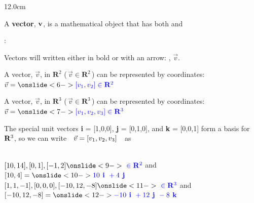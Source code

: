 \begin{frame}
\frametitle{}
\scriptsize
\begin{columns}
\begin{column}{12.0cm}
	
	\DEF A {\bf vector}, ${\bf v}$, is a mathematical object that has both  and \ON<3->{\B{\quad direction.}}

\vspace{0.3cm}

: \\

\vspace{0.2cm}

\OBUL  Vectors will written either in bold or with an arrow: , $\vec{v}$.\\

\vspace{0.2cm}

\OBUL  A vector, $\vec{v}$, in $\mathbf{R}^2$ (\,$\vec{v} \in \mathbf{R}^2$\,) can be represented by  coordinates: \quad $\vec{v} = \ON<6->{\B{\VV \in \mathbf{R}^2}}$\\

\vspace{0.2cm}

\OBUL  A vector, $\vec{v}$, in $\mathbf{R}^3$ (\,$\vec{v} \in \mathbf{R}^3$\,) can be represented by  coordinates: \quad $\vec{v} = \ON<7->{\B{\VVV \in \mathbf{R}^3}}$\\

\vspace{0.2cm}

\OBUL  The special unit vectors {\bf i} = [1,0,0], {\bf j} = [0,1,0], and {\bf k} = [0,0,1] form a basis for $\mathbf{R}^3$, \NEWLINE so we can write \,\, $\vec{v} = [v_1,v_2,v_3]$ \,\, as \,\, 

\vspace{0.3cm}

\EX \\
\vspace{0.1cm}
\OBUL $[10,14], [0,1], [-1,2] \ON<9->{\B{\,\, \in \mathbf{R}^2}}$ \quad and \quad $[10,4] = \ON<10->{\B{10\VI + 4 \VJ}}$\\
\vspace{0.2cm}
\OBUL $[1,1,-1], [0,0,0], [-10,12,-8] \ON<11->{\B{\,\, \in \mathbf{R}^3}}$ \quad and \quad $[-10,12,-8] = \ON<12->{\B{-10\VI + 12 \VJ - 8\VK}}$\\


\end{column}
\end{columns}
\end{frame}
